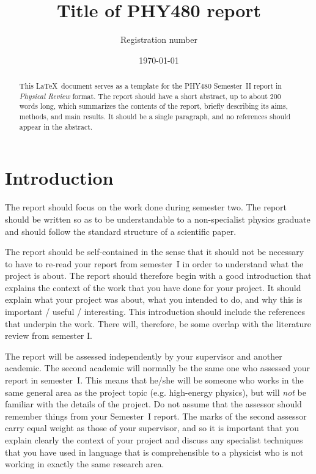 \documentclass[aps,pra,twocolumn]{revtex4-2}
\begin{document}
\title{Title of PHY480 report}
\author{Registration number}

\date{\today}

\begin{abstract}
This \LaTeX\ document serves as a template for the PHY480 Semester~II report in \textit{Physical Review} format. The report should have a short abstract, up to about 200 words long, which summarizes the contents of the report, briefly describing its aims, methods, and main results.
It should be a single paragraph, and no references should appear in the abstract.
\end{abstract}

\maketitle


\section{Introduction}
\label{sec:introduction}

The report should focus on the work done during semester two. The report should be written so as to be understandable to a non-specialist physics graduate and should follow the standard structure of a scientific paper. 

The report should be self-contained in the sense that it should not be necessary to have to re-read your report from semester~I in order to understand what the project is about. The report should therefore begin with a good introduction that explains the context of the work that you have done for your project. It should explain what your project was about, what you intended to do, and why this is important / useful / interesting. This introduction should include the references that underpin the work. There will, therefore, be some overlap with the literature review from semester I.

The report will be assessed independently by your supervisor and another academic. The second academic will normally be the same one who assessed your report in semester~I. This means that he/she will be someone who works in the same general area as the project topic (e.g. high-energy physics), but will {\em not} be familiar with the details of the project. Do not assume that the assessor should remember things from your Semester~I report. The marks of the second assessor carry equal weight as those of your supervisor, and so it is important that you explain clearly the context of your project and discuss any specialist techniques that you have used in language that is comprehensible to a physicist who is not working in exactly the same research area.
\end{document}
